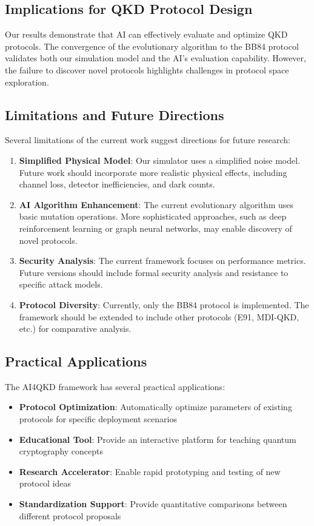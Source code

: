 \documentclass[aps,prl,reprint,superscriptaddress]{revtex4-2}
\begin{document}
\subsection{Implications for QKD Protocol Design}
Our results demonstrate that AI can effectively evaluate and optimize QKD protocols. The convergence of the evolutionary algorithm to the BB84 protocol validates both our simulation model and the AI's evaluation capability. However, the failure to discover novel protocols highlights challenges in protocol space exploration.

\subsection{Limitations and Future Directions}
Several limitations of the current work suggest directions for future research:

\begin{enumerate}
    \item \textbf{Simplified Physical Model}: Our simulator uses a simplified noise model. Future work should incorporate more realistic physical effects, including channel loss, detector inefficiencies, and dark counts.
    
    \item \textbf{AI Algorithm Enhancement}: The current evolutionary algorithm uses basic mutation operations. More sophisticated approaches, such as deep reinforcement learning or graph neural networks, may enable discovery of novel protocols.
    
    \item \textbf{Security Analysis}: The current framework focuses on performance metrics. Future versions should include formal security analysis and resistance to specific attack models.
    
    \item \textbf{Protocol Diversity}: Currently, only the BB84 protocol is implemented. The framework should be extended to include other protocols (E91, MDI-QKD, etc.) for comparative analysis.
\end{enumerate}

\subsection{Practical Applications}
The AI4QKD framework has several practical applications:
\begin{itemize}
    \item \textbf{Protocol Optimization}: Automatically optimize parameters of existing protocols for specific deployment scenarios
    \item \textbf{Educational Tool}: Provide an interactive platform for teaching quantum cryptography concepts
    \item \textbf{Research Accelerator}: Enable rapid prototyping and testing of new protocol ideas
    \item \textbf{Standardization Support}: Provide quantitative comparisons between different protocol proposals
\end{itemize}
\end{document}
